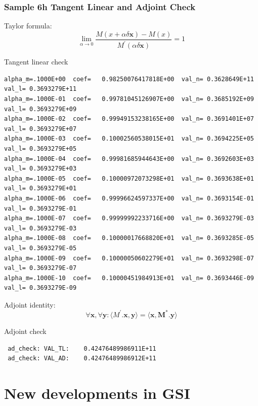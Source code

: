 \documentclass[10pt]{beamer}
\begin{document}
\begin{frame}[fragile]
\frametitle{Sample 6h Tangent Linear and Adjoint Check }
\tiny{
Taylor formula:
\begin{equation*}
\lim_{\alpha \to 0}\frac{M(x+\alpha\delta\mathbf{x})-M(x)}{M^{'}({\alpha\delta\mathbf{x}})}=1
\end{equation*}
\begin{beamerboxesrounded}[ lower=postit,shadow=true]{Tangent linear check}
\begin{verbatim}
alpha_m=.1000E+00  coef=   0.98250076417818E+00  val_n= 0.3628649E+11  val_l= 0.3693279E+11
alpha_m=.1000E-01  coef=   0.99781045126907E+00  val_n= 0.3685192E+09  val_l= 0.3693279E+09
alpha_m=.1000E-02  coef=   0.99949153238165E+00  val_n= 0.3691401E+07  val_l= 0.3693279E+07
alpha_m=.1000E-03  coef=   0.10002560538015E+01  val_n= 0.3694225E+05  val_l= 0.3693279E+05
alpha_m=.1000E-04  coef=   0.99981685944643E+00  val_n= 0.3692603E+03  val_l= 0.3693279E+03
alpha_m=.1000E-05  coef=   0.10000972073298E+01  val_n= 0.3693638E+01  val_l= 0.3693279E+01
alpha_m=.1000E-06  coef=   0.99996624597337E+00  val_n= 0.3693154E-01  val_l= 0.3693279E-01
alpha_m=.1000E-07  coef=   0.99999992233716E+00  val_n= 0.3693279E-03  val_l= 0.3693279E-03
alpha_m=.1000E-08  coef=   0.10000017668820E+01  val_n= 0.3693285E-05  val_l= 0.3693279E-05
alpha_m=.1000E-09  coef=   0.10000050602279E+01  val_n= 0.3693298E-07  val_l= 0.3693279E-07
alpha_m=.1000E-10  coef=   0.10000451984913E+01  val_n= 0.3693446E-09  val_l= 0.3693279E-09
\end{verbatim}
\end{beamerboxesrounded}}
Adjoint identity:
\begin{equation*}
\forall\mathbf{x}, \forall\mathbf{y} : \langle{M^{'}.\mathbf{x},\mathbf{y}}\rangle =  \langle{\mathbf{x},\mathbf{M^{*}}.\mathbf{y}}\rangle
\end{equation*}
\tiny{
\begin{beamerboxesrounded}[ lower=postit,shadow=true]{Adjoint check}
\begin{verbatim}
 ad_check: VAL_TL:    0.42476489986911E+11
 ad_check: VAL_AD:    0.42476489986912E+11
\end{verbatim}
\end{beamerboxesrounded}}
\end{frame}

\section{New developments in GSI}
\end{document}
